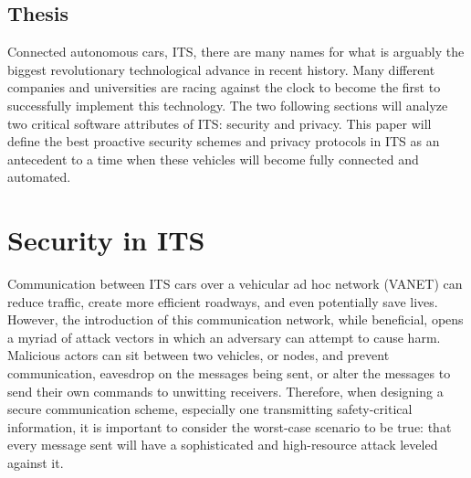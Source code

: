 \documentclass[conference,compsoc]{IEEEtran}
\begin{document}
\subsection{Thesis}
Connected autonomous cars, ITS, there are many names for what is arguably the biggest revolutionary technological advance in recent history. Many different companies and universities are racing against the clock to become the first to successfully implement this technology. The two following sections will analyze two critical software attributes of ITS: security and privacy. This paper will define the best proactive security schemes and privacy protocols in ITS as an antecedent to a time when these vehicles will become fully connected and automated. 


\section{Security in ITS}
Communication between ITS cars over a vehicular ad hoc network (VANET) can reduce traffic, create more efficient roadways, and even potentially save lives. However, the introduction of this communication network, while beneficial, opens a myriad of attack vectors in which an adversary can attempt to cause harm. Malicious actors can sit between two vehicles, or nodes, and prevent communication, eavesdrop on the messages being sent, or alter the messages to send their own commands to unwitting receivers. Therefore, when designing a secure communication scheme, especially one transmitting safety-critical information, it is important to consider the worst-case scenario to be true: that every message sent will have a sophisticated and high-resource attack leveled against it.
\end{document}
